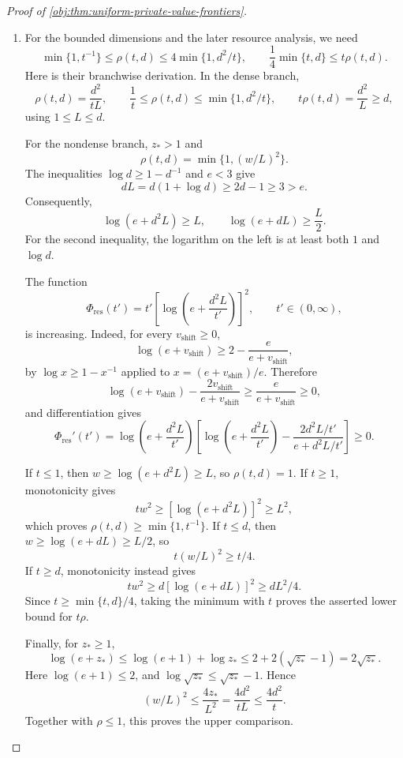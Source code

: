 \documentclass[11pt]{article}
\begin{document}
\begin{proof}[Proof of \cref{obj:thm:uniform-private-value-frontiers}]
\begin{enumerate}
\item
For the bounded dimensions and the later resource analysis, we need
\[
\min\{1,t^{-1}\}\le\rho(t,d)
\le4\min\{1,d^2/t\},
\qquad
\frac14\min\{t,d\}\le t\rho(t,d).
\]
Here is their branchwise derivation. In the dense branch,
\[
\rho(t,d)=\frac{d^2}{tL},
\qquad
\frac1t\le\rho(t,d)\le\min\{1,d^2/t\},
\qquad
t\rho(t,d)=\frac{d^2}{L}\ge d,
\]
using \(1\le L\le d\).

For the nondense branch, \(z_*>1\) and
\[
\rho(t,d)=\min\{1,(w/L)^2\}.
\]
The inequalities \(\log d\ge1-d^{-1}\) and \(e<3\) give
\[
dL=d(1+\log d)\ge2d-1\ge3>e.
\]
Consequently,
\[
\log(e+d^2L)\ge L,
\qquad
\log(e+dL)\ge\frac L2.
\]
For the second inequality, the logarithm on the left is at least both
\(1\) and \(\log d\).

The function
\[
\Phi_{\mathrm{res}}(t')
=t'\left[\log\left(e+\frac{d^2L}{t'}\right)\right]^2,
\qquad t'\in(0,\infty),
\]
is increasing. Indeed, for every \(v_{\mathrm{shift}}\ge0\),
\[
\log(e+v_{\mathrm{shift}})
\ge2-\frac e{e+v_{\mathrm{shift}}},
\]
by \(\log x\ge1-x^{-1}\) applied to
\(x=(e+v_{\mathrm{shift}})/e\). Therefore
\[
\log(e+v_{\mathrm{shift}})
-\frac{2v_{\mathrm{shift}}}{e+v_{\mathrm{shift}}}
\ge\frac e{e+v_{\mathrm{shift}}}\ge0,
\]
and differentiation gives
\[
\Phi_{\mathrm{res}}'(t')
=
\log\left(e+\frac{d^2L}{t'}\right)
\left[
\log\left(e+\frac{d^2L}{t'}\right)
-\frac{2d^2L/t'}{e+d^2L/t'}
\right]\ge0.
\]

If \(t\le1\), then \(w\ge\log(e+d^2L)\ge L\), so \(\rho(t,d)=1\).
If \(t\ge1\), monotonicity gives
\[
tw^2\ge[\log(e+d^2L)]^2\ge L^2,
\]
which proves \(\rho(t,d)\ge\min\{1,t^{-1}\}\).
If \(t\le d\), then \(w\ge\log(e+dL)\ge L/2\), so
\[
t(w/L)^2\ge t/4.
\]
If \(t\ge d\), monotonicity instead gives
\[
tw^2\ge d[\log(e+dL)]^2\ge dL^2/4.
\]
Since \(t\ge\min\{t,d\}/4\), taking the minimum with \(t\) proves the asserted lower bound for \(t\rho\).

Finally, for \(z_*\ge1\),
\[
\log(e+z_*)
\le\log(e+1)+\log z_*
\le2+2(\sqrt{z_*}-1)=2\sqrt{z_*}.
\]
Here \(\log(e+1)\le2\), and
\(\log\sqrt{z_*}\le\sqrt{z_*}-1\).
Hence
\[
(w/L)^2\le\frac{4z_*}{L^2}
=\frac{4d^2}{tL}\le\frac{4d^2}{t}.
\]
Together with \(\rho\le1\), this proves the upper comparison.


\end{enumerate}
\end{proof}
\end{document}
